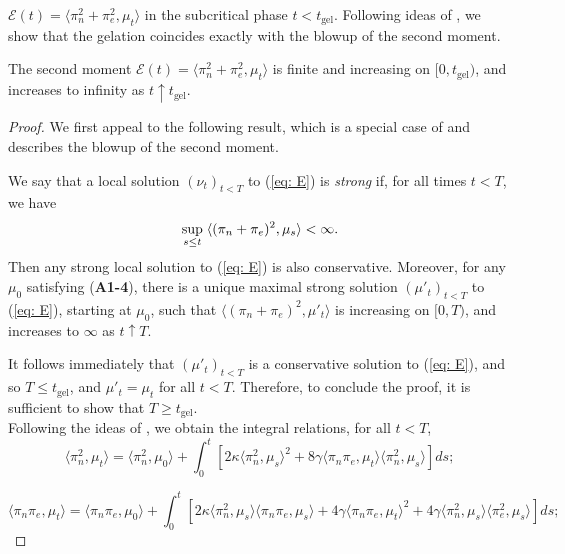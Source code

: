 $\mathcal{E}(t)=\langle \pi_n^2+\pi_e^2, \mu_t\rangle$ in the subcritical phase $t<t_\text{gel}$. Following ideas of \cite{N00}, we show that the gelation coincides exactly with the blowup of the second moment. \begin{lemma}\label{lemma: second moment before tgel} The second moment $\mathcal{E}(t)=\langle \pi_n^2+\pi_e^2, \mu_t\rangle$ is finite and increasing on $[0, t_\text{gel})$, and increases to infinity as $t\uparrow t_\text{gel}$. \end{lemma} \begin{proof} We first appeal to the following result, which is a special case of \cite[Theorem 2.1]{N00} and describes the blowup of the second moment. \begin{lemma} We say that a local solution $(\nu_t)_{t<T}$ to (\ref{eq: E}) is \emph{strong} if, for all times $t<T$, we have \begin{equation}
    \sup_{s\le t} \hspace{0.1cm} \langle( \pi_n+\pi_e)^2, \mu_s\rangle <\infty.
\end{equation} Then any strong local solution to (\ref{eq: E}) is also conservative. Moreover, for any $\mu_0$ satisfying (\textbf{A1-4}), there is a unique maximal strong solution $(\mu'_t)_{t<T}$ to (\ref{eq: E}), starting at $\mu_0$, such that $ \langle (\pi_n+\pi_e)^2, \mu'_t\rangle$ is increasing on $[0,T)$, and increases to $ \infty$  as $t\uparrow T$. \end{lemma} 

It follows immediately that $(\mu'_t)_{t<T}$ is a  conservative solution to (\ref{eq: E}), and so $T \le t_\text{gel}$, and $\mu'_t=\mu_t$ for all $t<T$. Therefore, to conclude the proof, it is sufficient to show that $T\ge t_\text{gel}$. \medskip \\ Following the ideas of \cite[Proposition 2.7]{N00}, we obtain the integral relations, for all $t<T$, \begin{equation}
    \langle \pi_n^2, \mu_t\rangle =
    \langle \pi_n^2, \mu_0\rangle + \int_0^t \left[2\kappa\langle \pi_n^2, \mu_s\rangle^2+8\gamma\langle \pi_n\pi_e, \mu_t\rangle\langle\pi_n^2, \mu_s\rangle \right] ds;
\end{equation} 

\begin{equation}
    \langle \pi_n \pi_e, \mu_t\rangle =
    \langle \pi_n\pi_e, \mu_0\rangle + \int_0^t \left[2\kappa\langle \pi_n^2, \mu_s\rangle\langle \pi_n\pi_e, \mu_s\rangle+4\gamma\langle \pi_n\pi_e, \mu_t\rangle^2+4\gamma\langle\pi_n^2, \mu_s\rangle\langle \pi_e^2, \mu_s \rangle \right] ds;
\end{equation}


\end{proof}
